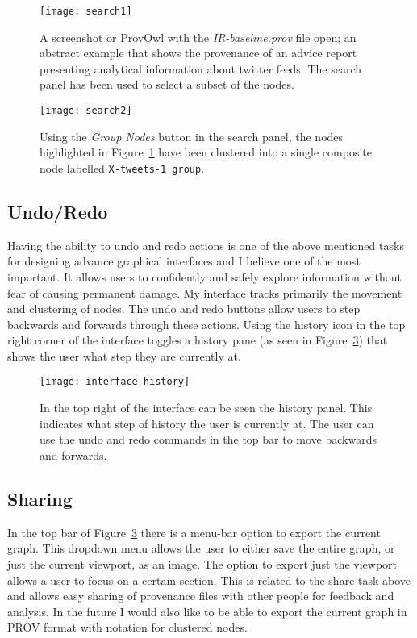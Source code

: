 \begin{figure}[h]
	\centering
	\texttt{[image: search1]}
	\caption{A screenshot or ProvOwl with the \textit{IR-baseline.prov} file open; an abstract example that shows the provenance of an advice report presenting analytical information about twitter feeds. The search panel has been used to select a subset of the nodes.}
	\label{fig:search1}
\end{figure}
\begin{figure}[h]
	\centering
	\texttt{[image: search2]}
	\caption{Using the \textit{Group Nodes} button in the search panel, the nodes highlighted in Figure~\ref{fig:search1} have been clustered into a single composite node labelled \texttt{X-tweets-1 group}.}
	\label{fig:search2}
\end{figure}

\clearpage

\subsection{Undo/Redo}
\label{sec:history}

Having the ability to undo and redo actions is one of the above mentioned tasks for designing advance graphical interfaces and I believe one of the most important. It allows users to confidently and safely explore information without fear of causing permanent damage. My interface tracks primarily the movement and clustering of nodes. The undo and redo buttons allow users to step backwards and forwards through these actions. Using the history icon in the top right corner of the interface toggles a history pane (as seen in Figure~\ref{fig:interface-history}) that shows the user what step they are currently at. 

\begin{figure}[h]
	\centering
	\texttt{[image: interface-history]}
	\caption{In the top right of the interface can be seen the history panel. This indicates what step of history the user is currently at. The user can use the undo and redo commands in the top bar to move backwards and forwards.}
	\label{fig:interface-history}
\end{figure}

\subsection{Sharing}
\label{sec:sharing}

In the top bar of Figure~\ref{fig:interface-history} there is a menu-bar option to export the current graph. This dropdown menu allows the user to either save the entire graph, or just the current viewport, as an image. The option to export just the viewport allows a user to focus on a certain section. This is related to the share task above and allows easy sharing of provenance files with other people for feedback and analysis. In the future I would also like to be able to export the current graph in PROV format with notation for clustered nodes.

